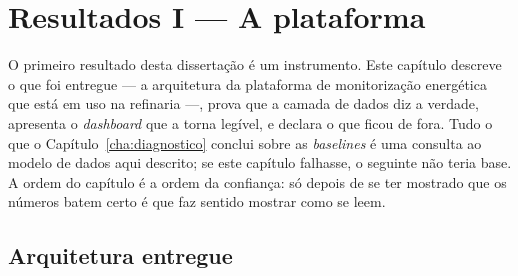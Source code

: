 
\chapter{Resultados I --- A plataforma}
\label{cha:plataforma}

O primeiro resultado desta dissertação é um instrumento. Este capítulo
descreve o que foi entregue --- a arquitetura da plataforma de
monitorização energética que está em uso na refinaria ---, prova que a
camada de dados diz a verdade, apresenta o \emph{dashboard} que a torna
legível, e declara o que ficou de fora. Tudo o que o
Capítulo~\ref{cha:diagnostico} conclui sobre as \emph{baselines} é uma
consulta ao modelo de dados aqui descrito; se este capítulo falhasse, o
seguinte não teria base. A ordem do capítulo é a ordem da confiança: só
depois de se ter mostrado que os números batem certo é que faz sentido
mostrar como se leem.

\section{Arquitetura entregue}
\label{sec:arquitetura}

